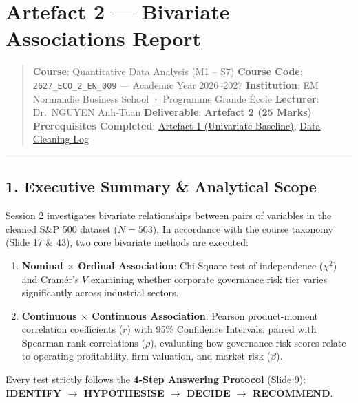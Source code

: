 \documentclass[
]{article}
\author{}
\date{}
\providecommand{\tightlist}{%
  \setlength{\itemsep}{0pt}\setlength{\parskip}{0pt}}
\begin{document}
\section{Artefact 2 --- Bivariate Associations
Report}\label{artefact-2-bivariate-associations-report}

\begin{quote}
\textbf{Course}: Quantitative Data Analysis (M1 -- S7) \textbf{Course
Code}: \texttt{2627\_ECO\_2\_EN\_009} --- Academic Year 2026--2027
\textbf{Institution}: EM Normandie Business School · Programme Grande
École \textbf{Lecturer}: Dr.~NGUYEN Anh-Tuan \textbf{Deliverable}:
\textbf{Artefact 2 (25 Marks)} \textbf{Prerequisites Completed}:
\href{Artefact_1_Session_1.md}{Artefact 1 (Univariate Baseline)},
\href{Data_Cleaning_Log.md}{Data Cleaning Log}
\end{quote}

\begin{center}\rule{0.5\linewidth}{0.5pt}\end{center}

\subsection{1. Executive Summary \& Analytical
Scope}\label{executive-summary-analytical-scope}

Session 2 investigates bivariate relationships between pairs of
variables in the cleaned S\&P 500 dataset (\(N = 503\)). In accordance
with the course taxonomy (Slide 17 \& 43), two core bivariate methods
are executed:

\begin{enumerate}
\def\labelenumi{\arabic{enumi}.}
\tightlist
\item
  \textbf{Nominal \(\times\) Ordinal Association}: Chi-Square test of
  independence (\(\chi^2\)) and Cramér's \(V\) examining whether
  corporate governance risk tier varies significantly across industrial
  sectors.
\item
  \textbf{Continuous \(\times\) Continuous Association}: Pearson
  product-moment correlation coefficients (\(r\)) with 95\% Confidence
  Intervals, paired with Spearman rank correlations (\(\rho\)),
  evaluating how governance risk scores relate to operating
  profitability, firm valuation, and market risk (\(\beta\)).
\end{enumerate}

Every test strictly follows the \textbf{4-Step Answering Protocol}
(Slide 9): \textbf{IDENTIFY \(\rightarrow\) HYPOTHESISE \(\rightarrow\)
DECIDE \(\rightarrow\) RECOMMEND}.
\end{document}
